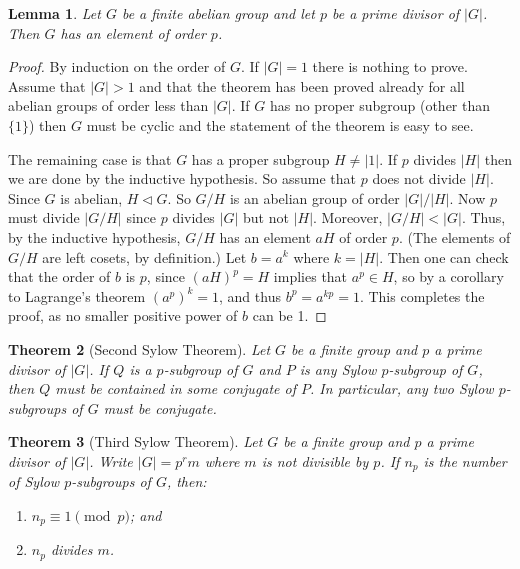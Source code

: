 \documentclass[11pt,oneside]{article}
\newtheorem{thm}{Theorem}[section]
\newtheorem{lem}[thm]{Lemma}
\theoremstyle{definition}
\begin{document}
\begin{lem} \label{Cauchy-abelian} 
Let $G$ be a finite abelian group and let $p$ be a prime divisor of
$|G|$. Then $G$ has an element of order $p$.
\end{lem}

\begin{proof}
By induction on the order of $G$. If $|G|=1$ there is nothing to
prove. Assume that $|G|>1$ and that the theorem has been proved
already for all abelian groups of order less than $|G|$. If $G$ has no 
proper subgroup (other than $\{1\}$) then $G$ must be cyclic and the
statement of the theorem is easy to see. 

The remaining case is that $G$ has a proper subgroup $H \ne |{1|}$.
If $p$ divides $|H|$ then we are done by the inductive hypothesis. So
assume that $p$ does not divide $|H|$. Since $G$ is abelian, $H
\triangleleft G$. So $G/H$ is an abelian group of order $|G|/|H|$.
Now $p$ must divide $|G/H|$ since $p$ divides $|G|$ but not $|H|$.
Moreover, $|G/H| < |G|$. Thus, by the inductive hypothesis, $G/H$ has
an element $aH$ of order $p$. (The elements of $G/H$ are left cosets,
by definition.) Let $b=a^k$ where $k = |H|$. Then one can check that
the order of $b$ is $p$, since $(aH)^p = H$ implies that $a^p \in H$,
so by a corollary to Lagrange's theorem $(a^p)^k = 1$, and thus $b^p =
a^{kp} = 1$. This completes the proof, as no smaller positive power of
$b$ can be 1.
\end{proof}


\begin{thm}[Second Sylow Theorem]
Let $G$ be a finite group and $p$ a prime divisor of $|G|$. If $Q$ is
a $p$-subgroup of $G$ and $P$ is any Sylow $p$-subgroup of $G$, then
$Q$ must be contained in some conjugate of $P$. In particular, any two
Sylow $p$-subgroups of $G$ must be conjugate.
\end{thm}


\begin{thm}[Third Sylow Theorem]
Let $G$ be a finite group and $p$ a prime divisor of $|G|$.  Write
$|G|=p^r m$ where $m$ is not divisible by $p$. If $n_p$ is the number
of Sylow $p$-subgroups of $G$, then:
\begin{enumerate}
\item[(a)] $n_p \equiv 1 \pmod{p}$; and

\item[(b)] $n_p$ divides $m$.
\end{enumerate}
\end{thm} 
\end{document}
